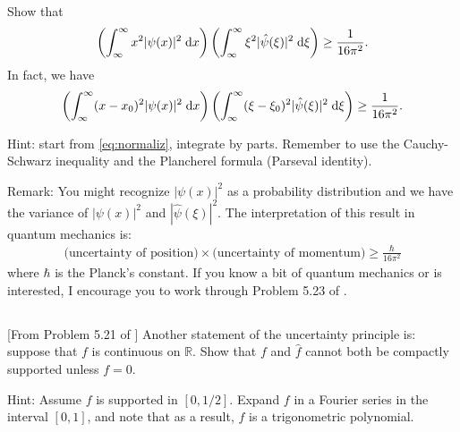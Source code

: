 \documentclass[11pt,letterpaper]{article}
\begin{document}
\subsection{}
Show that
\begin{align}
    \left( \int_\infty^\infty x^2|\psi(x)|^2 \;\mathrm{d} x \right)\left( \int_\infty^\infty \xi^2|\hat\psi(\xi)|^2 \;\mathrm{d} \xi \right) \geq \frac{1}{16\pi^2}.
\end{align}
In fact, we have
\begin{align}
    \left( \int_\infty^\infty (x-x_0)^2|\psi(x)|^2 \;\mathrm{d} x \right)\left( \int_\infty^\infty (\xi-\xi_0)^2|\hat\psi(\xi)|^2 \;\mathrm{d} \xi \right) \geq \frac{1}{16\pi^2}.
\end{align}

Hint: start from \eqref{eq:normaliz}, integrate by parts. Remember to use the Cauchy-Schwarz inequality and the Plancherel formula (Parseval identity). 

Remark: You might recognize $|\psi(x)|^2$ as a probability distribution and we have the variance of $|\psi(x)|^2$ and $|\hat\psi(\xi)|^2$. The interpretation of this result in quantum mechanics is:
\begin{align}
    \text{(uncertainty of position)}\times\text{(uncertainty of momentum)} \geq \frac{\hbar}{16\pi^2}
\end{align}
where $\hbar$ is the Planck's constant. If you know a bit of quantum mechanics or is interested, I encourage you to work through Problem 5.23 of \cite{SteinShakarchi_03}. 

\subsection{}
[From Problem 5.21 of \cite{SteinShakarchi_03}] Another statement of the uncertainty principle is: suppose that $f$ is continuous on $\mathbb{R}$. Show that $f$ and $\hat f$ cannot both be compactly supported unless $f = 0$. 

Hint: Assume $f$ is supported in $[0, 1/2]$. Expand $f$ in a Fourier series in the
interval $[0, 1]$, and note that as a result, $f$ is a trigonometric polynomial.



\vfill
\printbibliography
\end{document}
